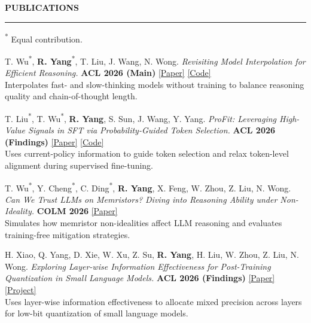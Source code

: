 \documentclass[11pt,a4paper]{article}
\newcommand{\venuebadge}[1]{\begingroup\setlength{\fboxsep}{1.5pt}\colorbox{venuefill}{\textcolor{venuetext}{\bfseries #1}}\endgroup}
\newenvironment{rSection}[1]{
  \Needspace{7\baselineskip}\medskip
  \textbf{#1}\smallskip\hrule\smallskip
}{\par}
\begin{document}
\newpage
\begin{rSection}{PUBLICATIONS}\small\raggedright
\textsuperscript{*} Equal contribution.
\begin{enumerate}[label={[\arabic*]}]
\item\begin{samepage} T. Wu\textsuperscript{*}, \textbf{R. Yang}\textsuperscript{*}, T. Liu, J. Wang, N. Wong. \textit{Revisiting Model Interpolation for Efficient Reasoning.} \venuebadge{ACL 2026 (Main)} \href{https://aclanthology.org/2026.acl-long.389/}{[Paper]} \href{https://github.com/wutaiqiang/MI}{[Code]}\\[1pt]{\textcolor{summarytext}{Interpolates fast- and slow-thinking models without training to balance reasoning quality and chain-of-thought length.}}\par\end{samepage}
\item\begin{samepage} T. Liu\textsuperscript{*}, T. Wu\textsuperscript{*}, \textbf{R. Yang}, S. Sun, J. Wang, Y. Yang. \textit{ProFit: Leveraging High-Value Signals in SFT via Probability-Guided Token Selection.} \venuebadge{ACL 2026 (Findings)} \href{https://aclanthology.org/2026.findings-acl.755/}{[Paper]} \href{https://github.com/Utaotao/ProFit}{[Code]}\\[1pt]{\textcolor{summarytext}{Uses current-policy information to guide token selection and relax token-level alignment during supervised fine-tuning.}}\par\end{samepage}
\item\begin{samepage} T. Wu\textsuperscript{*}, Y. Cheng\textsuperscript{*}, C. Ding\textsuperscript{*}, \textbf{R. Yang}, X. Feng, W. Zhou, Z. Liu, N. Wong. \textit{Can We Trust LLMs on Memristors? Diving into Reasoning Ability under Non-Ideality.} \venuebadge{COLM 2026} \href{https://arxiv.org/abs/2603.13725}{[Paper]}\\[1pt]{\textcolor{summarytext}{Simulates how memristor non-idealities affect LLM reasoning and evaluates training-free mitigation strategies.}}\par\end{samepage}
\item\begin{samepage} H. Xiao, Q. Yang, D. Xie, W. Xu, Z. Su, \textbf{R. Yang}, H. Liu, W. Zhou, Z. Liu, N. Wong. \textit{Exploring Layer-wise Information Effectiveness for Post-Training Quantization in Small Language Models.} \venuebadge{ACL 2026 (Findings)} \href{https://aclanthology.org/2026.findings-acl.771/}{[Paper]} \href{https://github.com/HeXiao-55/LieQ-official}{[Project]}\\[1pt]{\textcolor{summarytext}{Uses layer-wise information effectiveness to allocate mixed precision across layers for low-bit quantization of small language models.}}\par\end{samepage}

\end{enumerate}
\end{rSection}
\end{document}
